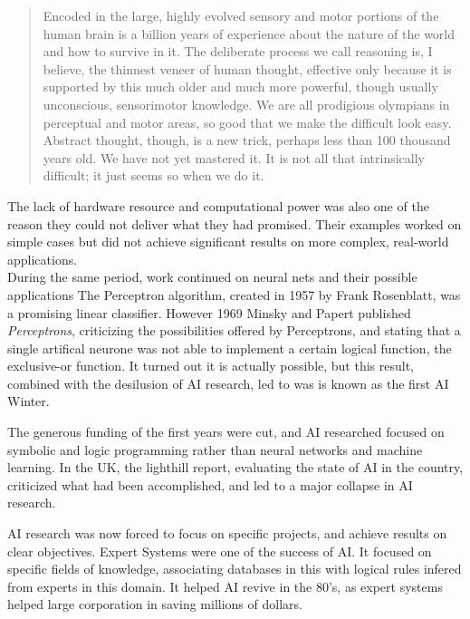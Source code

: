 \documentclass[12pt]{article}
\begin{document}
\begin{quotation}
  Encoded in the large, highly evolved sensory and motor portions of the human
  brain is a billion years of experience about the nature of the world and how
  to survive in it. The deliberate process we call reasoning is, I believe, the
  thinnest veneer of human thought, effective only because it is supported by
  this much older and much more powerful, though usually unconscious,
  sensorimotor knowledge. We are all prodigious olympians in perceptual and
  motor areas, so good that we make the difficult look easy. Abstract thought,
  though, is a new trick, perhaps less than 100 thousand years old. We have not
  yet mastered it. It is not all that intrinsically difficult; it just seems so
  when we do it. \cite{Moravec}
\end{quotation}

The lack of hardware resource and computational power was also one of the reason
they could not deliver what they had promised. Their examples worked on simple
cases but did not achieve significant results on more complex, real-world
applications.\\

During the same period, work continued on neural nets and their possible
applications The Perceptron algorithm, created in 1957 by Frank Rosenblatt, was
a promising linear classifier. However 1969 Minsky and Papert published {\em
Perceptrons}, criticizing the possibilities offered by Perceptrons, and stating
that a single artifical neurone was not able to implement a certain logical
function, the exclusive-or function. It turned out it is actually possible, but
this result, combined with the desilusion of AI research, led to was is known as
the first AI Winter.

The generous funding of the first years were cut, and AI researched focused on
symbolic and logic programming rather than neural networks and machine learning.
In the UK, the lighthill report, evaluating the state of AI in the country,
criticized what had been accomplished, and led to a major collapse in AI
research.

AI research was now forced to focus on specific projects, and achieve results on
clear objectives. Expert Systems were one of the success of AI. It focused on
specific fields of knowledge, associating databases in this with logical rules
infered from experts in this domain. It helped AI revive in the 80's, as expert
systems  helped large corporation in saving millions of dollars.\\
\end{document}
